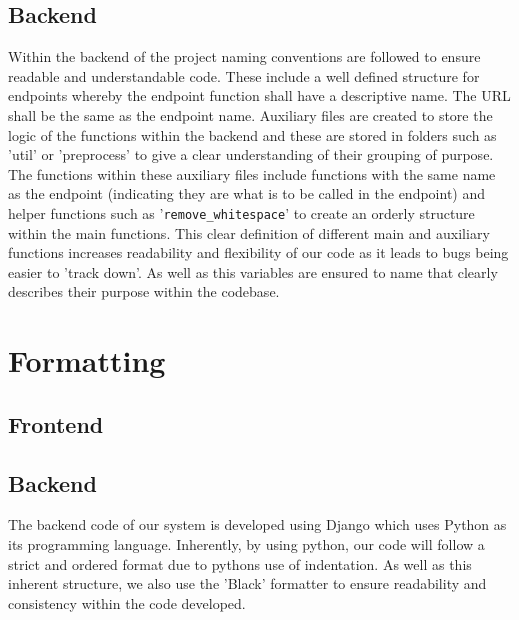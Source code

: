 \documentclass[12pt]{article}
\begin{document}
\subsection{Backend}
Within the backend of the project naming conventions are followed to ensure readable and understandable code. These include a well defined structure for endpoints whereby the endpoint function shall have a descriptive name. The URL shall be the same as the endpoint name. Auxiliary files are created to store the logic of the functions within the backend and these are stored in folders such as 'util' or 'preprocess' to give a clear understanding of their grouping of purpose. The functions within these auxiliary files include functions with the same name as the endpoint (indicating they are what is to be called in the endpoint) and helper functions such as '\texttt{remove\_whitespace}' to create an orderly structure within the main functions. This clear definition of different main and auxiliary functions increases readability and flexibility of our code as it leads to bugs being easier to 'track down'. As well as this variables are ensured to name that clearly describes their purpose within the codebase.

\newpage
\section{Formatting}
\subsection{Frontend}

\subsection{Backend}
The backend code of our system is developed using Django which uses Python as its programming language. Inherently, by using python, our code will follow a strict and ordered format due to pythons use of indentation. As well as this inherent structure, we also use the 'Black' formatter to ensure readability and consistency within the code developed.
\end{document}
